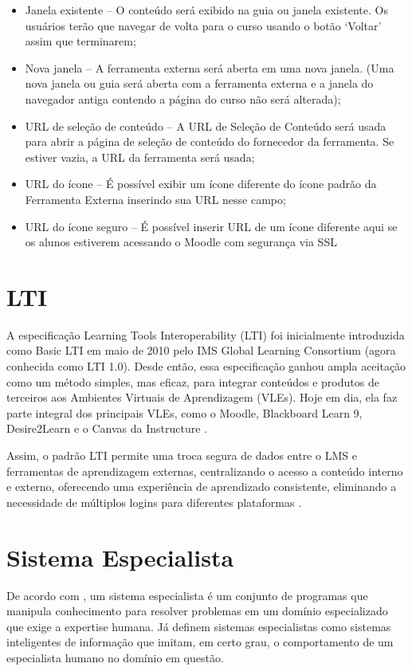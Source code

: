 \begin{itemize}
    \item Janela existente – O conteúdo será exibido na guia ou janela existente. Os usuários terão que navegar de volta para o curso usando o botão ‘Voltar’ assim que terminarem;
    \item Nova janela – A ferramenta externa será aberta em uma nova janela. (Uma nova janela ou guia será aberta com a ferramenta externa e a janela do navegador antiga contendo a página do curso não será alterada);
    \item URL de seleção de conteúdo – A URL de Seleção de Conteúdo será usada para abrir a página de seleção de conteúdo do fornecedor da ferramenta. Se estiver vazia, a URL da ferramenta será usada;
    \item URL do ícone – É possível exibir um ícone diferente do ícone padrão da Ferramenta Externa inserindo sua URL nesse campo;
    \item URL do ícone seguro – É possível inserir URL de um ícone diferente aqui se os alunos estiverem acessando o Moodle com segurança via SSL
\end{itemize}

\section{LTI}

A especificação Learning Tools Interoperability (LTI) foi inicialmente introduzida como Basic LTI em maio de 2010 pelo IMS Global Learning Consortium (agora conhecida como LTI 1.0). Desde então, essa especificação ganhou ampla aceitação como um método simples, mas eficaz, para integrar conteúdos e produtos de terceiros aos Ambientes Virtuais de Aprendizagem (VLEs). Hoje em dia, ela faz parte integral dos principais VLEs, como o Moodle, Blackboard Learn 9, Desire2Learn e o Canvas da Instructure \cite[p.4]{vickers}.

Assim, o padrão LTI permite uma troca segura de dados entre o LMS e ferramentas de aprendizagem externas, centralizando o acesso a conteúdo interno e externo, oferecendo uma experiência de aprendizado consistente, eliminando a necessidade de múltiplos logins para diferentes plataformas \cite{verdaguer}.

\section{Sistema Especialista}

De acordo com \textcite{jimmysingla}, um sistema especialista é um conjunto de programas que manipula conhecimento para resolver problemas em um domínio especializado que exige a expertise humana. Já \textcite{markobohanec} definem sistemas especialistas como sistemas inteligentes de informação que imitam, em certo grau, o comportamento de um especialista humano no domínio em questão.

